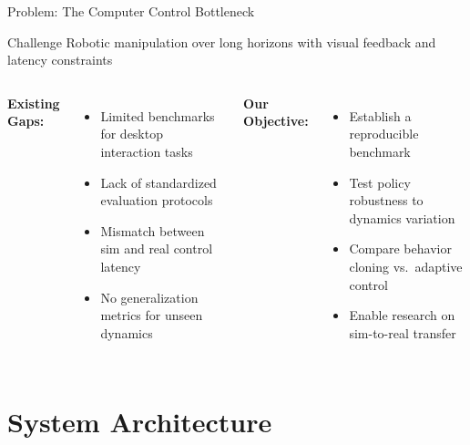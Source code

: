 \documentclass[10pt,aspectratio=16:9]{beamer}
\begin{document}
\begin{frame}{Problem: The Computer Control Bottleneck}
  \begin{block}{Challenge}
    \vspace{0.3em}
    Robotic manipulation over long horizons with visual feedback and latency constraints
    \vspace{0.3em}
  \end{block}

  \vspace{1em}

  \begin{columns}
    \textbf{Existing Gaps:}
    \begin{itemize}
      \item Limited benchmarks for desktop interaction tasks
      \item Lack of standardized evaluation protocols
      \item Mismatch between sim and real control latency
      \item No generalization metrics for unseen dynamics
    \end{itemize}

    \textbf{Our Objective:}
    \begin{itemize}
      \item Establish a reproducible benchmark
      \item Test policy robustness to dynamics variation
      \item Compare behavior cloning vs.\ adaptive control
      \item Enable research on sim-to-real transfer
    \end{itemize}
  \end{columns}
\end{frame}

\section{System Architecture}
\end{document}
